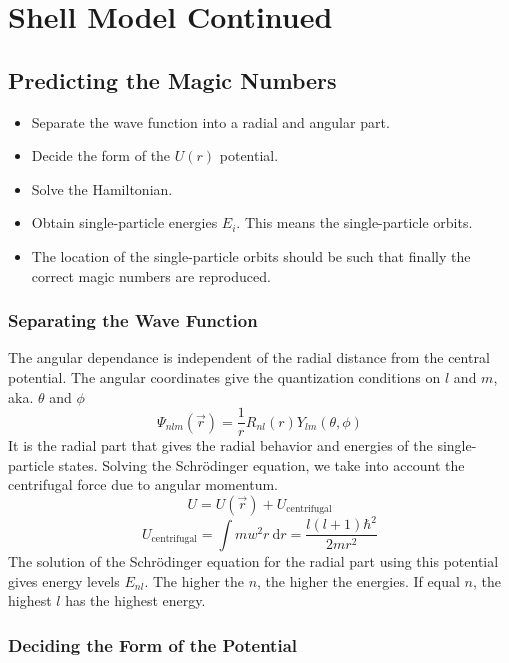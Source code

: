 \section{Shell Model Continued}
\subsection{Predicting the Magic Numbers}
\begin{itemize}
    \item Separate the wave function into a radial and angular part.
    \item Decide the form of the $U(r)$ potential. 
    \item Solve the Hamiltonian.
    \item Obtain single-particle energies $E_i$. This means the single-particle orbits. 
    \item The location of the single-particle orbits should be such that finally the correct magic numbers are reproduced. 
\end{itemize}

\subsubsection{Separating the Wave Function}
The angular dependance is independent of the radial distance from the central potential. The angular coordinates give the quantization conditions on $l$ and $m$, aka. $θ$ and $ϕ$
\begin{equation}
  Ψ_{nlm}(\vec{r}) = \frac{1}{r} R_{nl}(r) Y_{lm}(θ, ϕ)
\end{equation}
It is the radial part that gives the radial behavior and energies of the single-particle states. Solving the Schrödinger equation, we take into account the centrifugal force due to angular momentum.
\begin{equation}
  U = U(\vec{r}) + U_{\text{centrifugal}}
\end{equation}
\begin{equation}
  U_{\text{centrifugal}} = ∫ mw^2 r \ \mathrm{d}r = \frac{l(l+1) \hbar^2}{2m r^2}
\end{equation}
The solution of the Schrödinger equation for the radial part using this potential gives energy levels $E_{nl}$. The higher the $n$, the higher the energies. If equal $n$, the highest $l$ has the highest energy.

\subsubsection{Deciding the Form of the Potential}
